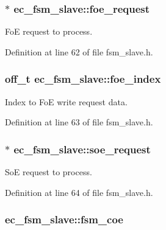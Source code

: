 \subsubsection[{foe\-\_\-request}]{$\ast$ ec\-\_\-fsm\-\_\-slave\-::foe\-\_\-request}\label{structec__fsm__slave_a3fa15bb678542863b36f3e79081df19a}


Fo\-E request to process. 



Definition at line 62 of file fsm\-\_\-slave.\-h.

\subsubsection[{foe\-\_\-index}]{\setlength{\rightskip}{0pt plus 5cm}off\-\_\-t ec\-\_\-fsm\-\_\-slave\-::foe\-\_\-index}\label{structec__fsm__slave_aad54bfb331ddd0f5de61d24b415b03fe}


Index to Fo\-E write request data. 



Definition at line 63 of file fsm\-\_\-slave.\-h.

\subsubsection[{soe\-\_\-request}]{$\ast$ ec\-\_\-fsm\-\_\-slave\-::soe\-\_\-request}\label{structec__fsm__slave_a927d20b1685eea5160c96ca9f8748d12}


So\-E request to process. 



Definition at line 64 of file fsm\-\_\-slave.\-h.

\subsubsection[{fsm\-\_\-coe}]{ ec\-\_\-fsm\-\_\-slave\-::fsm\-\_\-coe}\label{structec__fsm__slave_ac9f6c23ca16927be8dab824caf95878f}


